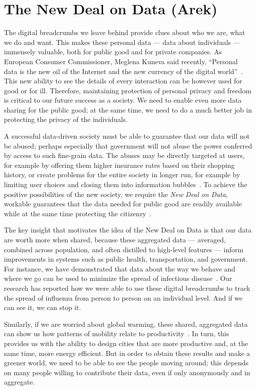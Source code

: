 \section{The New Deal on Data (Arek)}

The digital breadcrumbs we leave behind provide clues about who we are, what we do and want.
This makes these personal data --- data about individuals --- immensely valuable, both for public good and for private companies.
As European Consumer Commissioner, Meglena Kuneva said recently, ``Personal data is the new oil of the Internet and the new currency of the digital world''~\cite{kuneva2009}.
This new ability to see the details of every interaction can be however used for good or for ill.
Therefore, maintaining protection of personal privacy and freedom is critical to our future success as a society.
We need to enable even more data sharing for the public good; at the same time, we need to do a much better job in protecting the privacy of the individuals.

A successful data-driven society must be able to guarantee that our data will not be abused; perhaps especially that government will not abuse the power conferred by access to such fine-grain data.
The abuses may be directly targeted at users, for example by offering them higher insurance rates based on their shopping history, or create problems for the entire society in longer run, for example by limiting user choices and closing them into information bubbles~\cite{hannak2013measuring}. 
To achieve the positive possibilities of the new society, we require the \emph{New Deal on Data}, workable guarantees that the data needed for public good are readily available while at the same time protecting the citizenry~\cite{pentland2009reality}.

The key insight that motivates the idea of the New Deal on Data is that our data are worth more when shared, because these aggregated data --- averaged, combined across population, and often distilled to high-level features --- inform improvements in systems such as public health, transportation, and government.
For instance, we have demonstrated that data about the way we behave and where we go can be used to minimize the spread of infectious disease~\cite{madan2010social, pentland2009using}.
Our research has reported how we were able to use these digital breadcrumbs to track the spread of influenza from person to person on an individual level.
And if we can see it, we can stop it.

Similarly, if we are worried about global warming, these shared, aggregated data can show us how patterns of mobility relate to productivity~\cite{pan2013urban}.
In turn, this provides us with the ability to design cities that are more productive and, at the same time, more energy efficient.
But in order to obtain these results and make a greener world, we need to be able to see the people moving around; this depends on many people willing to contribute their data, even if only anonymously and in aggregate.

